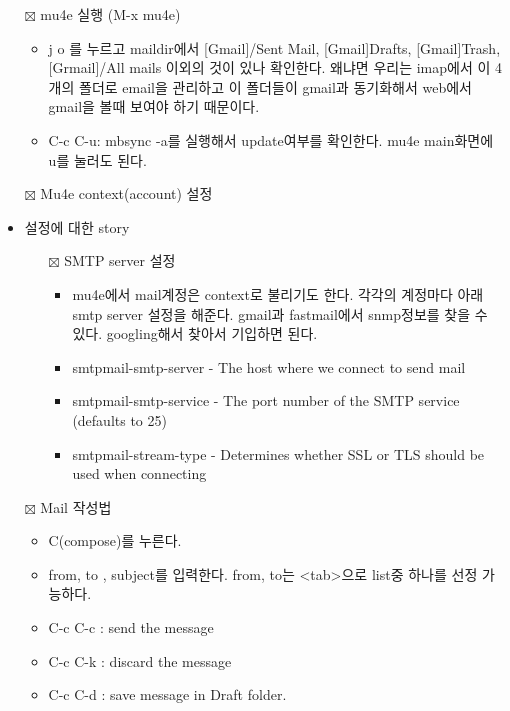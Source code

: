 \documentclass[11pt]{article}
\begin{document}
\begin{itemize}
\item[{$\boxtimes$}] mu4e 실행 (M-x mu4e)
\begin{itemize}
\item j o 를 누르고 maildir에서 [Gmail]/Sent Mail, [Gmail]Drafts, [Gmail]Trash,[Grmail]/All mails 이외의 것이 있나 확인한다. 왜냐면 우리는 imap에서 이 4개의 폴더로 email을 관리하고 이 폴더들이 gmail과 동기화해서 web에서 gmail을 볼때 보여야 하기 때문이다.

\item C-c C-u: mbsync -a를 실행해서 update여부를 확인한다. mu4e main화면에 u를 눌러도 된다.
\end{itemize}
\item[{$\boxtimes$}] Mu4e context(account) 설정
\end{itemize}
\begin{itemize}
\item 설정에 대한 story
\begin{itemize}
\item[{$\boxtimes$}] SMTP server 설정
\begin{itemize}
\item mu4e에서 mail계정은 context로 불리기도 한다. 각각의 계정마다 아래 smtp server 설정을 해준다. gmail과 fastmail에서 snmp정보를 찾을 수 있다. googling해서 찾아서 기입하면 된다.
\item smtpmail-smtp-server - The host where we connect to send mail
\item smtpmail-smtp-service - The port number of the SMTP service (defaults to 25)
\item smtpmail-stream-type - Determines whether SSL or TLS should be used when connecting
\end{itemize}
\end{itemize}

\item[{$\boxtimes$}] Mail 작성법
\begin{itemize}
\item C(compose)를 누른다.
\item from, to , subject를 입력한다. from, to는 <tab>으로 list중 하나를 선정 가능하다.
\item C-c C-c : send the message
\item C-c C-k : discard the message
\item C-c C-d : save message in Draft folder.
\end{itemize}


\end{itemize}
\end{document}
